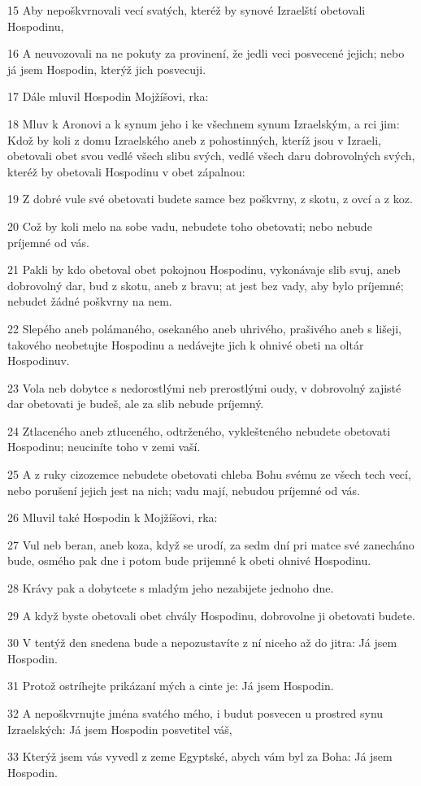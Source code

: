 \par 15 Aby nepoškvrnovali vecí svatých, kteréž by synové Izraelští obetovali Hospodinu,
\par 16 A neuvozovali na ne pokuty za provinení, že jedli veci posvecené jejich; nebo já jsem Hospodin, kterýž jich posvecuji.
\par 17 Dále mluvil Hospodin Mojžíšovi, rka:
\par 18 Mluv k Aronovi a k synum jeho i ke všechnem synum Izraelským, a rci jim: Kdož by koli z domu Izraelského aneb z pohostinných, kteríž jsou v Izraeli, obetovali obet svou vedlé všech slibu svých, vedlé všech daru dobrovolných svých, kteréž by obetovali Hospodinu v obet zápalnou:
\par 19 Z dobré vule své obetovati budete samce bez poškvrny, z skotu, z ovcí a z koz.
\par 20 Což by koli melo na sobe vadu, nebudete toho obetovati; nebo nebude príjemné od vás.
\par 21 Pakli by kdo obetoval obet pokojnou Hospodinu, vykonávaje slib svuj, aneb dobrovolný dar, bud z skotu, aneb z bravu; at jest bez vady, aby bylo príjemné; nebudet žádné poškvrny na nem.
\par 22 Slepého aneb polámaného, osekaného aneb uhrivého, prašivého aneb s lišeji, takového neobetujte Hospodinu a nedávejte jich k ohnivé obeti na oltár Hospodinuv.
\par 23 Vola neb dobytce s nedorostlými neb prerostlými oudy, v dobrovolný zajisté dar obetovati je budeš, ale za slib nebude príjemný.
\par 24 Ztlaceného aneb ztluceného, odtrženého, vyklešteného nebudete obetovati Hospodinu; neuciníte toho v zemi vaší.
\par 25 A z ruky cizozemce nebudete obetovati chleba Bohu svému ze všech tech vecí, nebo porušení jejich jest na nich; vadu mají, nebudou príjemné od vás.
\par 26 Mluvil také Hospodin k Mojžíšovi, rka:
\par 27 Vul neb beran, aneb koza, když se urodí, za sedm dní pri matce své zanecháno bude, osmého pak dne i potom bude prijemné k obeti ohnivé Hospodinu.
\par 28 Krávy pak a dobytcete s mladým jeho nezabijete jednoho dne.
\par 29 A když byste obetovali obet chvály Hospodinu, dobrovolne ji obetovati budete.
\par 30 V tentýž den snedena bude a nepozustavíte z ní niceho až do jitra: Já jsem Hospodin.
\par 31 Protož ostríhejte prikázaní mých a cinte je: Já jsem Hospodin.
\par 32 A nepoškvrnujte jména svatého mého, i budut posvecen u prostred synu Izraelských: Já jsem Hospodin posvetitel váš,
\par 33 Kterýž jsem vás vyvedl z zeme Egyptské, abych vám byl za Boha: Já jsem Hospodin.

